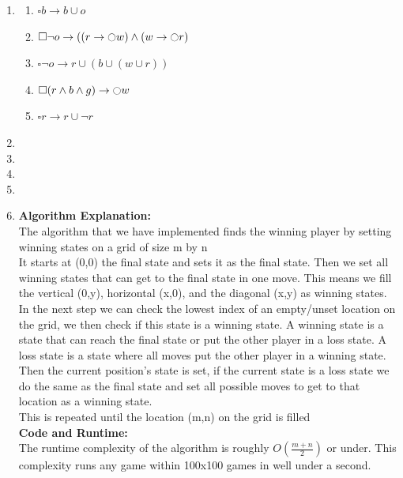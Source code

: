 \documentclass[a4paper,12pt]{article}
\begin{document}
\begin{enumerate}
\begin{enumerate}
			\end{enumerate}
		\item \begin{enumerate}
			\item $\square b \rightarrow b \cup o$
			\item $\square \neg o \rightarrow ((r \rightarrow \ocircle w) \wedge (w \rightarrow \ocircle r)$
			\item $\square \neg o \rightarrow r \cup (b \cup (w \cup r))$
			\item $\square (r \wedge b \wedge g) \rightarrow \ocircle w$
			\item $\square r \rightarrow r \cup \neg r$
		\end{enumerate}
		\item 
		\item 
		\item 
		\item 
		\item 
		
		\textbf{Algorithm Explanation:}\\
		
		The algorithm that we have implemented finds the winning player by setting winning states on a grid of size m by n\\
		
		It starts at (0,0) the final state and sets it as the final state. Then we set all winning states that can get to the final state in one move. This means we fill the vertical (0,y), horizontal (x,0), and the diagonal (x,y) as winning states.\\
		
		In the next step we can check the lowest index of an empty/unset location on the grid, we then check if this state is a winning state. A winning state is a state that can reach the final state or put the other player in a loss state. A loss state is a state where all moves put the other player in a winning state. Then the current position's state is set, if the current state is a loss state we do the same as the final state and set all possible moves to get to that location as a winning state.\\
		
		This is repeated until the location (m,n) on the grid is filled\\
		
		\textbf{Code and Runtime:}\\
		
		The runtime complexity of the algorithm is roughly $O(\frac{m+n}{2})$ or under. This complexity runs any game within 100x100 games in well under a second. \\
		

\end{enumerate}
\end{document}
